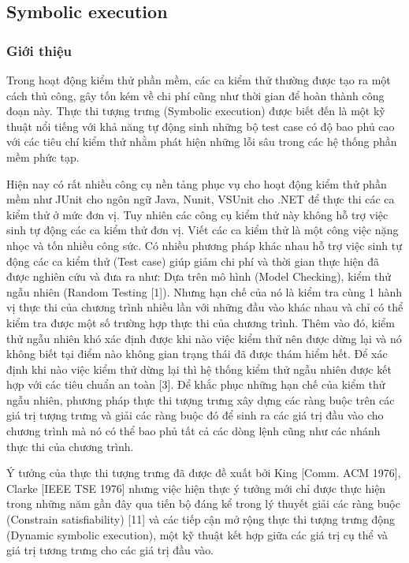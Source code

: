 \documentclass[12pt,a4paper]{article}
\begin{document}
\subsection{Symbolic execution}
\subsubsection{Giới thiệu}
Trong hoạt động kiểm thử phần mềm, các ca kiểm thử thường được tạo ra một cách thủ công, gây tốn kém về chi phí cũng như thời gian để hoàn thành công đoạn này. Thực thi tượng trưng (Symbolic execution) được biết đến là một kỹ thuật nổi tiếng với khả năng tự động sinh những bộ test case có độ bao phủ cao với các tiêu chí kiểm thử nhằm phát hiện những lỗi sâu trong các hệ thống phần mềm phức tạp.

\indent Hiện nay có rất nhiều công cụ nền tảng phục vụ cho hoạt động kiểm thử phần mềm như JUnit cho ngôn ngữ Java, Nunit, VSUnit cho .NET để thực thi các ca kiểm thử ở mức đơn vị. Tuy nhiên các công cụ kiểm thử này không hỗ trợ việc sinh tự động các ca kiểm thử đơn vị. Viết các ca kiểm thử là một công việc nặng nhọc và tốn nhiều công sức. Có nhiều phương pháp khác nhau hỗ trợ việc sinh tự động các ca kiểm thử (Test case) giúp giảm chi phí và thời gian thực hiện đã được nghiên cứu và đưa ra như: Dựa trên mô hình (Model Checking), kiểm thử ngẫu nhiên (Random Testing [1]). Nhưng hạn chế của nó là kiểm tra cùng 1 hành vị thực thi của chương trình nhiều lần với những đầu vào khác nhau và chỉ có thể kiểm tra được một số trường hợp thực thi của chương trình. Thêm vào đó, kiểm thử ngẫu nhiên khó xác định được khi nào việc kiểm thử nên được dừng lại và nó không biết tại điểm nào không gian trạng thái đã được thám hiểm hết. Để xác định khi nào việc kiểm thử dừng lại thì hệ thống kiểm thử ngẫu nhiên được kết hợp với các tiêu chuẩn an toàn [3]. Để khắc phục những hạn chế của kiểm thử ngẫu nhiên, phương pháp thực thi tượng trưng xây dựng các ràng buộc trên các giá trị tượng trưng và giải các ràng buộc đó để sinh ra các giá trị đầu vào cho chương trình mà nó có thể bao phủ tất cả các dòng lệnh cũng như các nhánh thực thi của chương trình.

\indent Ý tưởng của thực thi tượng trưng đã được đề xuất bởi King [Comm. ACM 1976], Clarke [IEEE TSE 1976] nhưng việc hiện thực ý tưởng mới chỉ được thực hiện trong những năm gần đây qua tiến bộ đáng kể trong lý thuyết giải các ràng buộc (Constrain satisfiability) [11] và các tiếp cận mở rộng thực thi tượng trưng động (Dynamic symbolic execution), một kỹ thuật kết hợp giữa các giá trị cụ thể và giá trị tương trưng cho các giá trị đầu vào.
\end{document}
